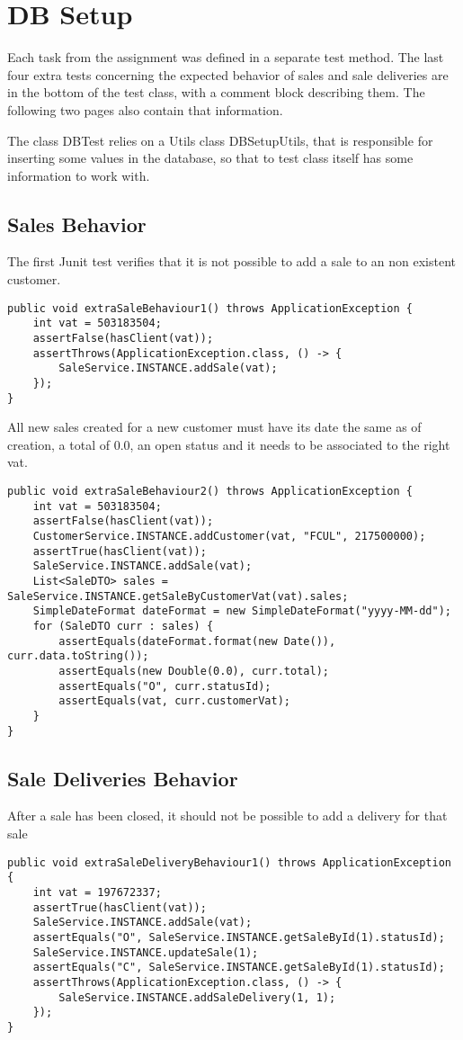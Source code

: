 \documentclass[12pt]{article}
\begin{document}
\section{DB Setup}
Each task from the assignment was defined in a separate test method. The last four extra tests concerning the expected behavior of sales and sale deliveries are in the bottom of the test class, with a comment block describing them. The following two pages also contain that information.

The class DBTest relies on a Utils class DBSetupUtils, that is responsible for inserting some values in the database, so that to test class itself has some information to work with.



\newpage
\subsection{Sales Behavior}
The first Junit test verifies that it is not possible to add a sale to an non existent customer. 
\begin{lstlisting}
public void extraSaleBehaviour1() throws ApplicationException {
	int vat = 503183504;
	assertFalse(hasClient(vat));
	assertThrows(ApplicationException.class, () -> {
		SaleService.INSTANCE.addSale(vat);
	});	
}	
\end{lstlisting}

All new sales created for a new customer must have its date the same as of creation, a total of 0.0, an open status and it needs to be associated to the right vat.
\begin{lstlisting}
public void extraSaleBehaviour2() throws ApplicationException {
	int vat = 503183504;
	assertFalse(hasClient(vat));
	CustomerService.INSTANCE.addCustomer(vat, "FCUL", 217500000);
	assertTrue(hasClient(vat));
	SaleService.INSTANCE.addSale(vat);
	List<SaleDTO> sales = SaleService.INSTANCE.getSaleByCustomerVat(vat).sales;
	SimpleDateFormat dateFormat = new SimpleDateFormat("yyyy-MM-dd");
	for (SaleDTO curr : sales) {
		assertEquals(dateFormat.format(new Date()), curr.data.toString());
		assertEquals(new Double(0.0), curr.total);
		assertEquals("O", curr.statusId);
		assertEquals(vat, curr.customerVat);
	}		
}
\end{lstlisting}
\subsection{Sale Deliveries Behavior}
After a sale has been closed, it should not be possible to add a delivery for that sale 
\begin{lstlisting}
public void extraSaleDeliveryBehaviour1() throws ApplicationException {
	int vat = 197672337;
	assertTrue(hasClient(vat));
	SaleService.INSTANCE.addSale(vat);
	assertEquals("O", SaleService.INSTANCE.getSaleById(1).statusId);
	SaleService.INSTANCE.updateSale(1);
	assertEquals("C", SaleService.INSTANCE.getSaleById(1).statusId);
	assertThrows(ApplicationException.class, () -> {
		SaleService.INSTANCE.addSaleDelivery(1, 1);
	});		
}
\end{lstlisting}
\end{document}
